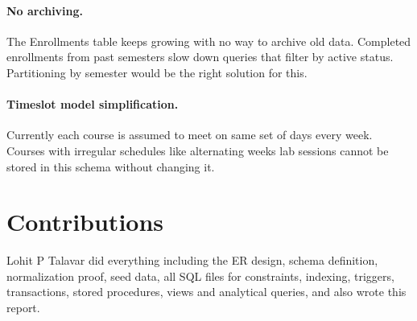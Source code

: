 \documentclass[11pt]{article}
\begin{document}
    \paragraph{No archiving.}
    The Enrollments table keeps growing with no way to archive old data. Completed
    enrollments from past semesters slow down queries that filter by active status.
    Partitioning by semester would be the right solution for this.

    \paragraph{Timeslot model simplification.}
    Currently each course is assumed to meet on same set of days every week. Courses
    with irregular schedules like alternating weeks lab sessions cannot be stored in
    this schema without changing it.

    \section{Contributions}

    Lohit P Talavar did everything including the ER design, schema definition,
    normalization proof, seed data, all SQL files for constraints, indexing, triggers,
    transactions, stored procedures, views and analytical queries, and also wrote this
    report.

    
\end{document}
